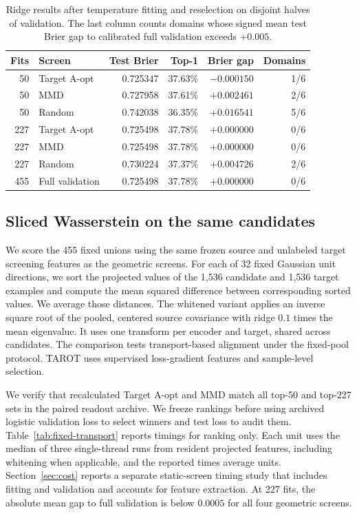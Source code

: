 \begin{table}[ht]
\centering
\caption{Ridge results after temperature fitting and reselection on disjoint halves of validation. The last column counts domains whose signed mean test Brier gap to calibrated full validation exceeds $+0.005$.}
\label{tab:ridge-calibration}
\begin{tabular}{rlrrrr}
\toprule
Fits & Screen & Test Brier & Top-1 & Brier gap & Domains \\
\midrule
50 & Target A-opt & 0.725347 & 37.63\% & $-0.000150$ & 1/6 \\
50 & MMD          & 0.727958 & 37.61\% & $+0.002461$ & 2/6 \\
50 & Random       & 0.742038 & 36.35\% & $+0.016541$ & 5/6 \\
227 & Target A-opt & 0.725498 & 37.78\% & $+0.000000$ & 0/6 \\
227 & MMD          & 0.725498 & 37.78\% & $+0.000000$ & 0/6 \\
227 & Random       & 0.730224 & 37.37\% & $+0.004726$ & 2/6 \\
455 & Full validation & 0.725498 & 37.78\% & $+0.000000$ & 0/6 \\
\bottomrule
\end{tabular}
\end{table}

\subsection{Sliced Wasserstein on the same candidates}
\label{app:transport-fixed}
We score the 455 fixed unions using the same frozen source and unlabeled target screening features as the geometric screens. For each of 32 fixed Gaussian unit directions, we sort the projected values of the 1,536 candidate and 1,536 target examples and compute the mean squared difference between corresponding sorted values. We average those distances. The whitened variant applies an inverse square root of the pooled, centered source covariance with ridge $0.1$ times the mean eigenvalue. It uses one transform per encoder and target, shared across candidates. The comparison tests transport-based alignment under the fixed-pool protocol. TAROT \citep{feng2025tarot} uses supervised loss-gradient features and sample-level selection.

We verify that recalculated Target A-opt and MMD match all top-50 and top-227 sets in the paired readout archive. We freeze rankings before using archived logistic validation loss to select winners and test loss to audit them. Table~\ref{tab:fixed-transport} reports timings for ranking only. Each unit uses the median of three single-thread runs from resident projected features, including whitening when applicable, and the reported times average units. Section~\ref{sec:cost} reports a separate static-screen timing study that includes fitting and validation and accounts for feature extraction. At 227 fits, the absolute mean gap to full validation is below $0.0005$ for all four geometric screens.

